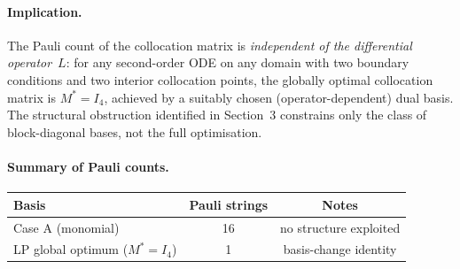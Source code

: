 \documentclass{article}
\begin{document}
\paragraph{Implication.}
The Pauli count of the collocation matrix is \emph{independent of the differential
operator}~$L$: for any second-order ODE on any domain with two boundary conditions
and two interior collocation points, the globally optimal collocation matrix is
$M^*=I_4$, achieved by a suitably chosen (operator-dependent) dual basis.  The
structural obstruction identified in Section~3 constrains only the class of
block-diagonal bases, not the full optimisation.

\paragraph{Summary of Pauli counts.}
\begin{center}
\begin{tabular}{lcc}
\hline
Basis & Pauli strings & Notes \\
\hline
Case A (monomial)             & 16 & no structure exploited \\
LP global optimum ($M^*=I_4$) &  1 & basis-change identity \\
\hline
\end{tabular}
\end{center}
\end{document}
